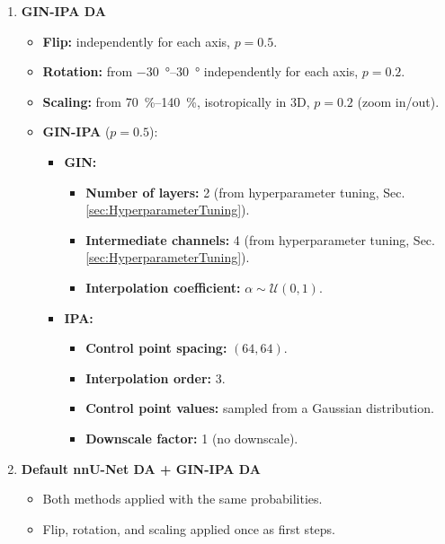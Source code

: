 \begin{enumerate}
    \item \textbf{GIN-IPA DA}
    \begin{itemize}
        \item \textbf{Flip:} independently for each axis, $p=0.5$.
        \item \textbf{Rotation:} from \qtyrange{-30}{30}{\degree} independently for each axis, $p=0.2$.
        \item \textbf{Scaling:} from \qtyrange{70}{140}{\percent}, isotropically in 3D, $p=0.2$ (zoom in/out).
        \item \textbf{GIN-IPA} ($p=0.5$):
        \begin{itemize}
            \item \textbf{GIN:}
            \begin{itemize}[label=$\diamond$]
                \item \textbf{Number of layers:} 2 (from hyperparameter tuning, Sec.\,\ref{sec:HyperparameterTuning}).
                \item \textbf{Intermediate channels:} 4 (from hyperparameter tuning, Sec.\,\ref{sec:HyperparameterTuning}).
                \item \textbf{Interpolation coefficient:} $\alpha \sim \mathcal{U}(0, 1)$.
            \end{itemize}
            \item \textbf{IPA:}
            \begin{itemize}[resume*]
                \item \textbf{Control point spacing:} $(64, 64)$.
                \item \textbf{Interpolation order:} \num{3}.
                \item \textbf{Control point values:} sampled from a Gaussian distribution.
                \item \textbf{Downscale factor:} \num{1} (no downscale).
            \end{itemize}
        \end{itemize}
    \end{itemize}

    \item \textbf{Default nnU-Net DA + GIN-IPA DA}
    \begin{itemize}
        \item Both methods applied with the same probabilities.
        \item Flip, rotation, and scaling applied once as first steps.
    \end{itemize}

\end{enumerate}


